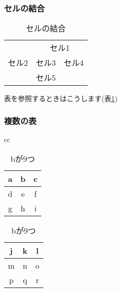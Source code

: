 \documentclass[12pt, b5paper]{ltjsarticle}
\begin{document}
            \subsubsection{セルの結合}
                \begin{table}[H]
                    \begin{center}
                    \caption{セルの結合}
                    \label{tab:sample1}
                    \begin{tabular}{|l|c|r|}
                        \hline
                         & \multicolumn{2}{|c|}{セル1} \\ \cline{2-3}
                        セル2 & セル3 & セル4  \\ \cline{2-2}
                         & セル5 &  \\ \hline
                    \end{tabular} 
                    \end{center}
                \end{table}
                表を参照するときはこうします(表\ref{tab:sample1})
            \subsubsection{複数の表}
            \begin{table}[H]
                \begin{center}
                \begin{tabular}{cc}
                
                \begin{minipage}{0.5\hsize}
                \begin{center}
                \begin{tabular}{|c|c|c|}
                \hline
                a & b & c \\ \hline
                d & e & f \\ \hline
                g & h & i \\ \hline
                \end{tabular}
                \caption{aが9つ}
                \end{center}
                \end{minipage}
                
                \begin{minipage}{0.5\hsize}
                \begin{center}
                \begin{tabular}{|c|c|c|}
                \hline
                j & k & l \\ \hline
                m & n & o \\ \hline
                p & q & r \\ \hline
                \end{tabular}
                \caption{bが9つ}
                \end{center}
                \end{minipage}
                
                \end{tabular}
                \end{center}
            \end{table}
\end{document}
